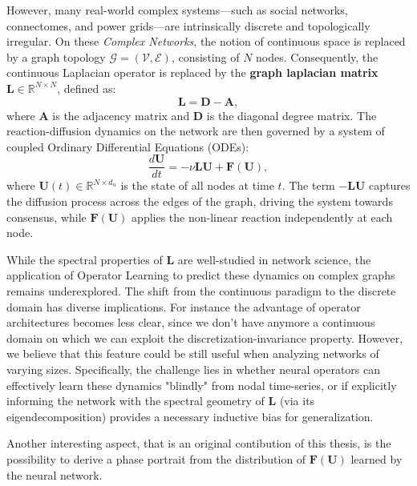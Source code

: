 However, many real-world complex systems—such as social networks, connectomes, and power grids—are 
intrinsically discrete and topologically irregular. On these \textit{Complex Networks}, 
the notion of continuous space is replaced by a graph topology $\mathcal{G} = (\mathcal{V}, \mathcal{E})$, consisting of $N$ nodes. Consequently, 
the continuous Laplacian operator is replaced by the \textbf{graph laplacian matrix} $\mathbf{L} \in \mathbb{R}^{N \times N}$, defined as:
\begin{equation}
    \mathbf{L} = \mathbf{D} - \mathbf{A},
\end{equation}
where $\mathbf{A}$ is the adjacency matrix and $\mathbf{D}$ is the diagonal degree matrix. The reaction-diffusion dynamics on the network are then governed by a system of coupled Ordinary Differential Equations (ODEs):
\begin{equation}
    \frac{d \mathbf{U}}{dt} = - \nu \mathbf{L} \mathbf{U} + \mathbf{F}(\mathbf{U}),
    \label{eq:react_diff_on_net}
\end{equation}
where $\mathbf{U}(t) \in \mathbb{R}^{N \times d_u}$ is the state of all nodes at time $t$. The term $- \mathbf{L} \mathbf{U}$ captures the diffusion process across the edges of the graph, driving the system towards consensus, while $\mathbf{F}(\mathbf{U})$ applies the non-linear reaction independently at each node.

While the spectral properties of $\mathbf{L}$ are well-studied in network science, the application of Operator Learning to predict these dynamics on complex graphs 
remains underexplored. 
The shift from the continuous paradigm to the discrete domain has diverse implications. For instance the advantage of operator architectures becomes less clear, since we don't have anymore a continuous domain on which we can exploit the discretization-invariance property. However, we believe that this feature could be still useful when analyzing networks of varying sizes.
\newline
Specifically, the challenge lies in whether neural operators can effectively learn these dynamics "blindly" from nodal time-series, 
or if explicitly informing the network with the spectral geometry of $\mathbf{L}$ (via its eigendecomposition) provides a necessary inductive bias for generalization.

Another interesting aspect, that is an original contibution of this thesis, is the possibility to derive a phase portrait from the distribution of $\mathbf{F}(\mathbf{U})$ learned by the neural network.

